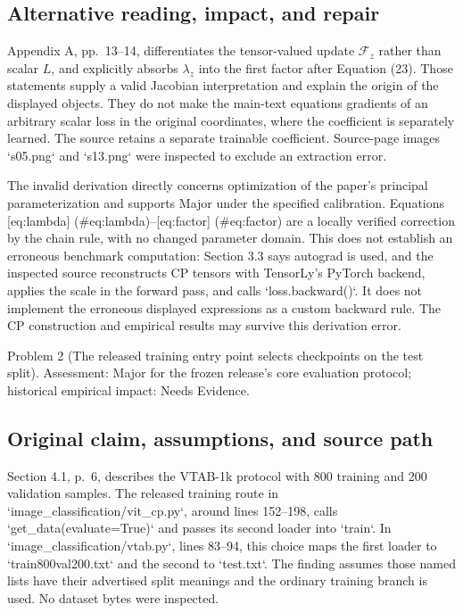 \documentclass[10pt]{article}
\begin{document}
\subsection*{Alternative reading, impact, and repair}
Appendix A, pp. 13–14, differentiates the tensor-valued update \(\mathcal F_z\) rather than scalar \(L\), and explicitly absorbs \(\lambda_z\) into the first factor after Equation (23). Those statements supply a valid Jacobian interpretation and explain the origin of the displayed objects. They do not make the main-text equations gradients of an arbitrary scalar loss in the original coordinates, where the coefficient is separately learned. The source retains a separate trainable coefficient. Source-page images `s05.png` and `s13.png` were inspected to exclude an extraction error.\par
The invalid derivation directly concerns optimization of the paper’s principal parameterization and supports Major under the specified calibration. Equations [eq:lambda] (\#eq:lambda)–[eq:factor] (\#eq:factor) are a locally verified correction by the chain rule, with no changed parameter domain. This does not establish an erroneous benchmark computation: Section 3.3 says autograd is used, and the inspected source reconstructs CP tensors with TensorLy’s PyTorch backend, applies the scale in the forward pass, and calls `loss.backward()`. It does not implement the erroneous displayed expressions as a custom backward rule. The CP construction and empirical results may survive this derivation error.\par
Problem 2 (The released training entry point selects checkpoints on the test split).  Assessment: Major for the frozen release’s core evaluation protocol; historical empirical impact: Needs Evidence.\par
\subsection*{Original claim, assumptions, and source path}
Section 4.1, p. 6, describes the VTAB-1k protocol with 800 training and 200 validation samples. The released training route in `image\_classification/vit\_cp.py`, around lines 152–198, calls `get\_data(evaluate=True)` and passes its second loader into `train`. In `image\_classification/vtab.py`, lines 83–94, this choice maps the first loader to `train800val200.txt` and the second to `test.txt`. The finding assumes those named lists have their advertised split meanings and the ordinary training branch is used. No dataset bytes were inspected.\par
\end{document}
